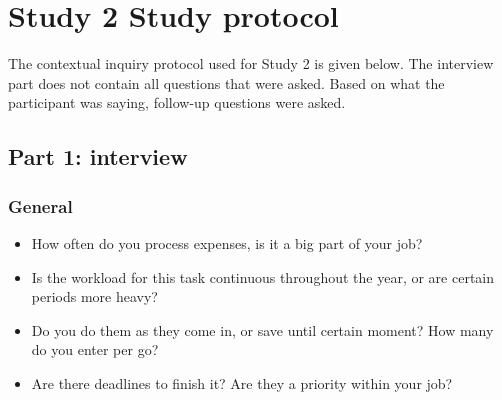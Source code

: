 \chapter{Study 2 Study protocol}
The contextual inquiry protocol used for Study 2 is given below. The interview part does not contain all questions that were asked. Based on what the participant was saying, follow-up questions were asked. 

\section{Part 1: interview}
\subsection{General}
\begin{itemize}
\item How often do you process expenses, is it a big part of your job?
\item Is the workload for this task continuous throughout the year, or are certain periods more heavy?
\item Do you do them as they come in, or save until certain moment? How many do you enter per go?
\item Are there deadlines to finish it? Are they a priority within your job?
\end{itemize}

